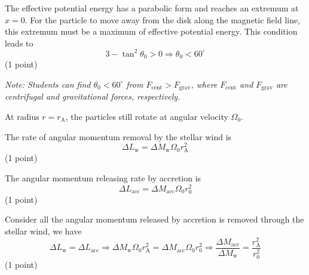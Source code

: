 \begin{description}
  The effective potential energy has a parabolic form and reaches an
  extremum at $x = 0$. For the particle to move away from the disk along the
  magnetic field line, this extremum must be a maximum of effective
  potential energy. This condition leads to
  \[ 3 - \tan^2\theta_0 > 0 \Rightarrow \theta_0 < 60^\circ \]
  \hfill(1 point)

  \emph{Note: Students can find $\theta_0 < 60^\circ$ from
  $F_{\mathrm{cent}} > F_{\mathrm{grav}}$, where $F_{\mathrm{cent}}$ and
  $F_{\mathrm{grav}}$ are centrifugal and gravitational forces,
  respectively.}

\item[(c)] At radius $r = r_{\mathrm{A}}$, the particles still rotate at
  angular velocity $\Omega_0$.

  The rate of angular momentum removal by the stellar wind is
  \[ \Delta L_{\mathrm{w}} = \Delta M_{\mathrm{w}}\Omega_0 r_{\mathrm{A}}^2 \]
  \hfill(1 point)

  The angular momentum releasing rate by accretion is
  \[ \Delta L_{\mathrm{acc}} = \Delta M_{\mathrm{acc}}\Omega_0 r_0^2 \]
  \hfill(1 point)

  Consider all the angular momentum released by accretion is removed through
  the stellar wind, we have
  \[ \Delta L_{\mathrm{w}} = \Delta L_{\mathrm{acc}}
     \Rightarrow \Delta M_{\mathrm{w}}\Omega_0 r_{\mathrm{A}}^2
       = \Delta M_{\mathrm{acc}}\Omega_0 r_0^2
     \Rightarrow \frac{\Delta M_{\mathrm{acc}}}{\Delta M_{\mathrm{w}}}
       = \frac{r_{\mathrm{A}}^2}{r_0^2} \]
  \hfill(1 point)
\end{description}

